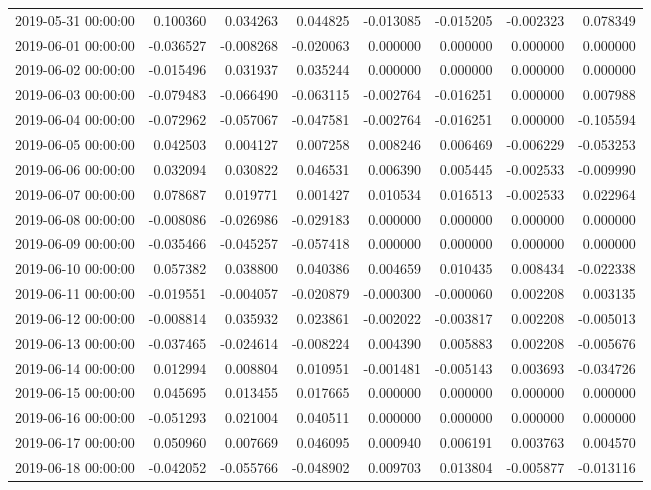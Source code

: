 \begin{tabular}{lrrrrrrr}
2019-05-31 00:00:00 & 0.100360 & 0.034263 & 0.044825 & -0.013085 & -0.015205 & -0.002323 & 0.078349 \\
2019-06-01 00:00:00 & -0.036527 & -0.008268 & -0.020063 & 0.000000 & 0.000000 & 0.000000 & 0.000000 \\
2019-06-02 00:00:00 & -0.015496 & 0.031937 & 0.035244 & 0.000000 & 0.000000 & 0.000000 & 0.000000 \\
2019-06-03 00:00:00 & -0.079483 & -0.066490 & -0.063115 & -0.002764 & -0.016251 & 0.000000 & 0.007988 \\
2019-06-04 00:00:00 & -0.072962 & -0.057067 & -0.047581 & -0.002764 & -0.016251 & 0.000000 & -0.105594 \\
2019-06-05 00:00:00 & 0.042503 & 0.004127 & 0.007258 & 0.008246 & 0.006469 & -0.006229 & -0.053253 \\
2019-06-06 00:00:00 & 0.032094 & 0.030822 & 0.046531 & 0.006390 & 0.005445 & -0.002533 & -0.009990 \\
2019-06-07 00:00:00 & 0.078687 & 0.019771 & 0.001427 & 0.010534 & 0.016513 & -0.002533 & 0.022964 \\
2019-06-08 00:00:00 & -0.008086 & -0.026986 & -0.029183 & 0.000000 & 0.000000 & 0.000000 & 0.000000 \\
2019-06-09 00:00:00 & -0.035466 & -0.045257 & -0.057418 & 0.000000 & 0.000000 & 0.000000 & 0.000000 \\
2019-06-10 00:00:00 & 0.057382 & 0.038800 & 0.040386 & 0.004659 & 0.010435 & 0.008434 & -0.022338 \\
2019-06-11 00:00:00 & -0.019551 & -0.004057 & -0.020879 & -0.000300 & -0.000060 & 0.002208 & 0.003135 \\
2019-06-12 00:00:00 & -0.008814 & 0.035932 & 0.023861 & -0.002022 & -0.003817 & 0.002208 & -0.005013 \\
2019-06-13 00:00:00 & -0.037465 & -0.024614 & -0.008224 & 0.004390 & 0.005883 & 0.002208 & -0.005676 \\
2019-06-14 00:00:00 & 0.012994 & 0.008804 & 0.010951 & -0.001481 & -0.005143 & 0.003693 & -0.034726 \\
2019-06-15 00:00:00 & 0.045695 & 0.013455 & 0.017665 & 0.000000 & 0.000000 & 0.000000 & 0.000000 \\
2019-06-16 00:00:00 & -0.051293 & 0.021004 & 0.040511 & 0.000000 & 0.000000 & 0.000000 & 0.000000 \\
2019-06-17 00:00:00 & 0.050960 & 0.007669 & 0.046095 & 0.000940 & 0.006191 & 0.003763 & 0.004570 \\
2019-06-18 00:00:00 & -0.042052 & -0.055766 & -0.048902 & 0.009703 & 0.013804 & -0.005877 & -0.013116 \\

\end{tabular}
